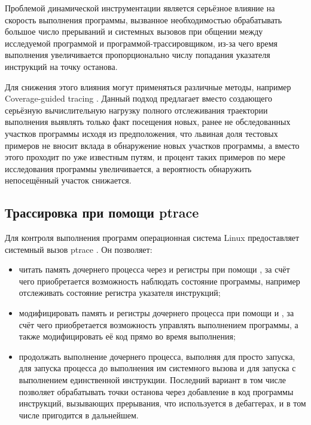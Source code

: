 Проблемой динамической инструментации является серьёзное влияние на скорость выполнения программы, вызванное необходимостью обрабатывать большое число прерываний и системных вызовов при общении между исследуемой программой и программой-трассировщиком, из-за чего время выполнения увеличивается пропорционально числу попадания указателя инструкций на точку останова.

Для снижения этого влияния могут применяться различные методы, например Coverage-guided tracing \cite{full-speed-fuzzing}. Данный подход предлагает вместо создающего серьёзную вычислительную нагрузку полного отслеживания траектории выполнения выявлять только факт посещения новых, ранее не обследованных участков программы исходя из предположения, что львиная доля тестовых примеров не вносит вклада в обнаружение новых участков программы, а вместо этого проходит по уже известным путям, и процент таких примеров по мере исследования программы увеличивается, а вероятность обнаружить непосещённый участок снижается.

\subsection{Трассировка при помощи ptrace}

Для контроля выполнения программ операционная система Linux предоставляет системный вызов ptrace \cite{ptrace}. Он позволяет:

\begin{itemize}
	\item читать память дочернего процесса через  и регистры при помощи , за счёт чего приобретается возможность наблюдать состояние программы, например отслеживать состояние регистра указателя инструкций;
	
	\item модифицировать память и регистры дочернего процесса при помощи  и , за счёт чего приобретается возможность управлять выполнением программы, а также модифицировать её код прямо во время выполнения;
	
	\item продолжать выполнение дочернего процесса, выполняя  для просто запуска,  для запуска процесса до выполнения им системного вызова и  для запуска с выполнением единственной инструкции. Последний вариант в том числе позволяет обрабатывать точки останова через добавление в код программы инструкций, вызывающих прерывания, что используется в дебаггерах, и в том числе пригодится в дальнейшем.
\end{itemize}

